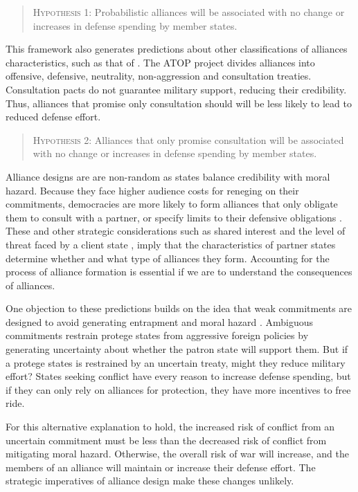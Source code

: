 \documentclass[12pt]{article}
\begin{document}
\begin{quote}
\textsc{Hypothesis 1}: Probabilistic alliances will be associated with no change or increases in defense spending by member states. 
\end{quote}

This framework also generates predictions about other classifications of alliances characteristics, such as that of \citet{Leedsetal2002}. The ATOP project divides alliances into offensive, defensive, neutrality, non-aggression and consultation treaties. Consultation pacts do not guarantee military support, reducing their credibility. Thus, alliances that promise only consultation should will be less likely to lead to reduced defense effort. 

\begin{quote}
\textsc{Hypothesis 2}: Alliances that only promise consultation will be associated with no change or increases in defense spending by member states. 
\end{quote}

Alliance designs are are non-random as states balance credibility with moral hazard. Because they face higher audience costs for reneging on their commitments, democracies are more likely to form alliances that only obligate them to consult with a partner, or specify limits to their defensive obligations \citep{Chibaetal2015}. These and other strategic considerations such as shared interest and the level of threat faced by a client state \citep{Yarhi-Miloetal2016}, imply that the characteristics of partner states determine whether and what type of alliances they form. Accounting for the process of alliance formation is essential if we are to understand the consequences of alliances. 

One objection to these predictions builds on the idea that weak commitments are designed to avoid generating entrapment and moral hazard \citep{Benson2012}. Ambiguous commitments restrain protege states from aggressive foreign policies by generating uncertainty about whether the patron state will support them. But if a protege states is restrained by an uncertain treaty, might they reduce military effort? States seeking conflict have every reason to increase defense spending, but if they can only rely on alliances for protection, they have more incentives to free ride. 

For this alternative explanation to hold, the increased risk of conflict from an uncertain commitment must be less than the decreased risk of conflict from mitigating moral hazard. Otherwise, the overall risk of war will increase, and the members of an alliance will maintain or increase their defense effort. The strategic imperatives of alliance design make these changes unlikely. 
\end{document}
